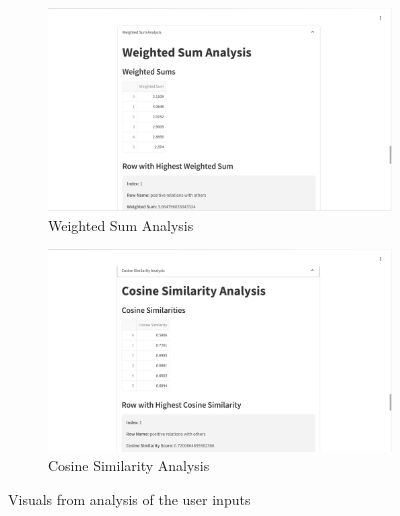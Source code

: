 \begin{figure}[H]
    \begin{subfigure}[b]{0.495\textwidth}
        \centering
        \includegraphics[width=\textwidth]{App Images/22 Interface.png}
        \caption{Weighted Sum Analysis}
        \label{fig:weighted_sum}
    \end{subfigure}
    \hfill
    \begin{subfigure}[b]{0.495\textwidth}
        \centering
        \includegraphics[width=\textwidth]{App Images/23 Interface.png}
        \caption{Cosine Similarity Analysis}
        \label{fig:cosine_similarity}
    \end{subfigure}

    \caption{Visuals from analysis of the user inputs}
    \label{fig:analysis_comparison}
\end{figure}

\pagebreak

